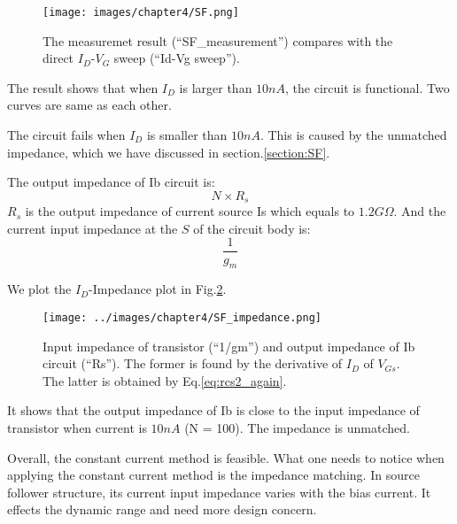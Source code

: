\begin{figure}[!htbp]
   \centering
   \texttt{[image: images/chapter4/SF.png]}
   \caption{The measuremet result (``SF\_measurement'') compares with the direct $I_D$-$V_G$ sweep (``Id-Vg sweep'').}
   \label{fig:SF_result}
\end{figure}

The result shows that when $I_D$ is larger than $10n A$, the circuit is functional.
Two curves are same as each other.

The circuit fails when $I_D$ is smaller than $10n A$.
This is caused by the unmatched impedance, which we have discussed in section.\ref{section:SF}.

The output impedance of Ib circuit is:
\begin{equation} \label{eq:rcs2_again}
    N\times R_s
\end{equation}
$R_s$ is the output impedance of current source Is which equals to $1.2G\Omega$.
And the current input impedance at the $S$ of the circuit body is:
\begin{equation} \label{eq:rsf2_again}
    \frac{1}{g_m}
\end{equation}

We plot the $I_D$-Impedance plot in Fig.\ref{fig:SF_imp}.

\begin{figure}[!htbp]
   \centering
   \texttt{[image: ../images/chapter4/SF\_impedance.png]}
   \caption{Input impedance of transistor (``1/gm'') and output impedance of Ib circuit (``Rs''). The former is found by the derivative of $I_D$ of $V_{Gs}$. The latter is obtained by Eq.\ref{eq:rcs2_again}.}
   \label{fig:SF_imp}
\end{figure}

It shows that the output impedance of Ib is close to the input impedance of transistor when current is $10n A$ (N = 100).
The impedance is unmatched.

Overall, the constant current method is feasible.
What one needs to notice when applying the constant current method is the impedance matching.
In source follower structure, its current input impedance varies with the bias current.
It effects the dynamic range and need more design concern.


